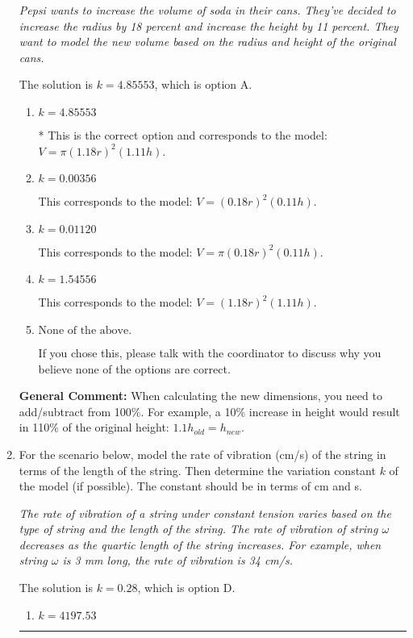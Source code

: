 \documentclass{extbook}[14pt]
\newcommand{\litem}[1]{\item #1

\rule{\textwidth}{0.4pt}}
\begin{document}
\begin{enumerate}
{\begin{center}
    \textit{ Pepsi wants to increase the volume of soda in their cans. They've decided to increase the radius by 18 percent and increase the height by 11 percent. They want to model the new volume based on the radius and height of the original cans. }
\end{center}
The solution is \( k = 4.85553 \), which is option A.\begin{enumerate}[label=\Alph*.]
\item \( k = 4.85553 \)

* This is the correct option and corresponds to the model: $V = \pi (1.18 r)^2 (1.11 h)$.
\item \( k = 0.00356 \)

This corresponds to the model: $V = (0.18 r)^2 (0.11 h)$.
\item \( k = 0.01120 \)

This corresponds to the model: $V = \pi (0.18 r)^2 (0.11 h)$.
\item \( k = 1.54556 \)

This corresponds to the model: $V = (1.18 r)^2 (1.11 h)$.
\item \( \text{None of the above.} \)

If you chose this, please talk with the coordinator to discuss why you believe none of the options are correct.
\end{enumerate}

\textbf{General Comment:} When calculating the new dimensions, you need to add/subtract from 100\%. For example, a 10\% increase in height would result in 110\% of the original height: $1.1h_{old} = h_{new}$.
}
\litem{
For the scenario below, model the rate of vibration (cm/s) of the string in terms of the length of the string. Then determine the variation constant $k$ of the model (if possible). The constant should be in terms of cm and s.

\begin{center}
    \textit{ The rate of vibration of a string under constant tension varies based on the type of string and the length of the string. The rate of vibration of string $\omega$ decreases as the quartic length of the string increases. For example, when string $\omega$ is 3 mm long, the rate of vibration is 34 cm/s. }
\end{center}
The solution is \( k = 0.28 \), which is option D.\begin{enumerate}[label=\Alph*.]
\item \( k = 4197.53 \)


\end{enumerate}}
\end{enumerate}
\end{document}
